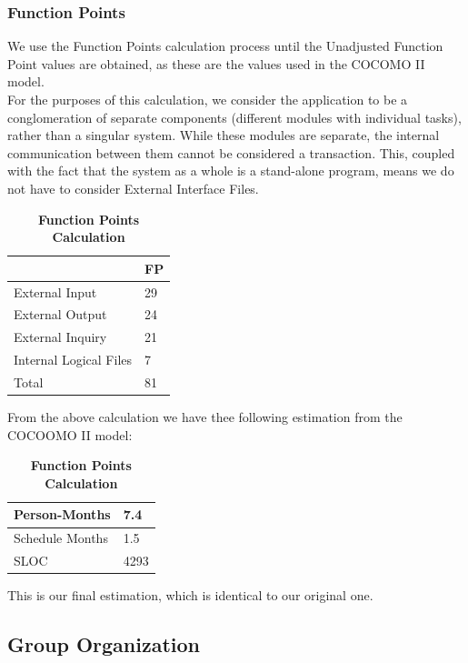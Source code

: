 \documentclass[hidelinks,conference,12pt]{IEEETran}
\begin{document}
\subsubsection{Function Points}
We use the Function Points calculation process until the Unadjusted Function Point values are obtained, as these are the values used in the COCOMO II model.\\
For the purposes of this calculation, we consider the application to be a conglomeration of separate components (different modules with individual tasks), rather than a singular system. While these modules are separate, the internal communication between them cannot be considered a transaction. This, coupled with the fact that the system as a whole is a stand-alone program, means we do not have to consider External Interface Files.

\FloatBarrier
\begin{table}[h]
	\centering
	\caption{\textbf{Function Points Calculation}}
	{\renewcommand{\arraystretch}{2}%
		\begin{tabular}{|l|p{1cm}|}
			\hline
			 & FP \\
			\hline
			External Input & 29 \\
			\hline
		    External Output & 24 \\
		    \hline 
			External Inquiry & 21 \\
			\hline
			Internal Logical Files & 7 \\
			\hline
			Total & 81 \\
			\hline
	\end{tabular}}
\end{table}
\FloatBarrier

From the above calculation we have thee following estimation from the COCOOMO II model:

\FloatBarrier
\begin{table}[h]
	\centering
	\caption{\textbf{Function Points Calculation}}
	{\renewcommand{\arraystretch}{2}%
		\begin{tabular}{|l|p{1cm}|}
			\hline
			Person-Months & 7.4 \\
			\hline
			Schedule Months & 1.5 \\
			\hline
			SLOC & 4293 \\
			\hline 
	\end{tabular}}
\end{table}
\FloatBarrier
This is our final estimation, which is identical to our original one.

\subsection{Group Organization}
\end{document}
